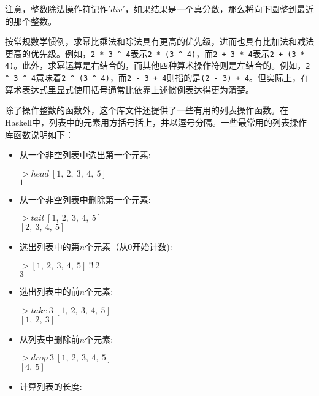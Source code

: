 注意，整数除法操作符记作$'div'$，如果结果是一个真分数，那么将向下圆整到最近的那个整数。

按常规数学惯例，求幂比乘法和除法具有更高的优先级，进而也具有比加法和减法更高的优先级。例如，\verb|2 * 3 ^ 4|表示\verb|2 * (3 ^ 4)|，而\verb|2 + 3 * 4|表示\verb|2 + (3 * 4)|。此外，求幂运算是右结合的，而其他四种算术操作符则是左结合的。例如，\verb|2 ^ 3 ^ 4|意味着\verb|2 ^ (3 ^ 4)|，而\verb|2 - 3 + 4|则指的是\verb|(2 - 3) + 4|。但实际上，在算术表达式里显式使用括号通常比依靠上述惯例表达得更为清楚。 

除了操作整数的函数外，这个库文件还提供了一些有用的列表操作函数。在Haskell中，列表中的元素用方括号括上，并以逗号分隔。一些最常用的列表操作库函数说明如下：

\begin{itemize}
\item 从一个非空列表中选出第一个元素:

\noindent\hspace*{1cm} $> head~[1,~2,~3,~4,~5]$\\
\hspace*{1cm} $1$

\item 从一个非空列表中删除第一个元素:

\noindent\hspace*{1cm} $> tail~[1,~2,~3,~4,~5]$\\
\hspace*{1cm} $[2,~3,~4,~5]$

\item 选出列表中的第$n$个元素（从0开始计数):

\noindent\hspace*{1cm} $> [1,~2,~3,~4,~5]~!!~2$\\
\hspace*{1cm} $3$

\item 选出列表中的前$n$个元素:

\noindent\hspace*{1cm} $> take~3~[1,~2,~3,~4,~5]$\\
\hspace*{1cm} $[1,~2,~3]$

\item 从列表中删除前$n$个元素:

\noindent\hspace*{1cm} $> drop~3~[1,~2,~3,~4,~5]$\\
\hspace*{1cm} $[4,~5]$

\item 计算列表的长度:


\end{itemize}

